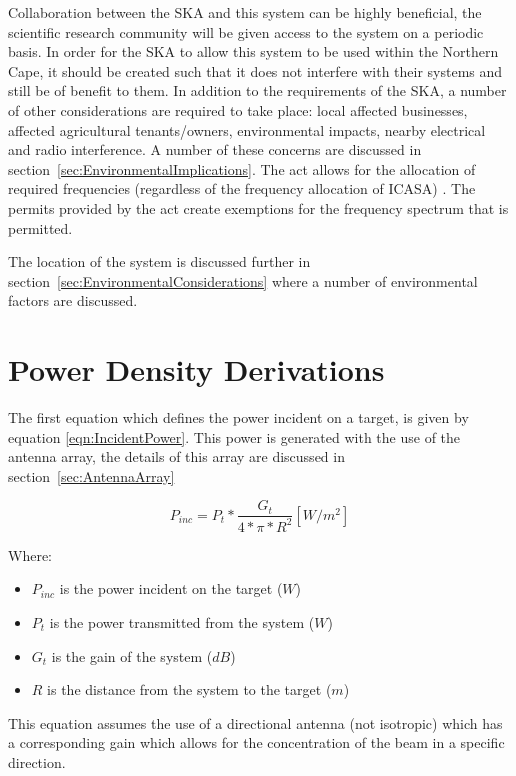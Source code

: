 \documentclass[11pt]{witseiepaper}
\begin{document}
\begin{bibunit}[witseie]
Collaboration between the SKA and this system can be highly beneficial, the scientific research community will be given access to the system on a periodic basis. In order for the SKA to allow this system to be used within the Northern Cape, it should be created such that it does not interfere with their systems and still be of benefit to them. In addition to the requirements of the SKA, a number of other considerations are required to take place: local affected businesses, affected agricultural tenants/owners, environmental impacts, nearby electrical and radio interference. A number of these concerns are discussed in section~\ref{sec:EnvironmentalImplications}.
The act allows for the allocation of required frequencies (regardless of the frequency allocation of ICASA) \cite{SKAAct}. The permits provided by the act create exemptions for the frequency spectrum that is permitted.

The location of the system is discussed further in section~\ref{sec:EnvironmentalConsiderations} where a number of environmental factors are discussed.

\section{Power Density Derivations} \label{sec:PowerDensityDerivations}
The first equation which defines the power incident on a target, is given by equation \ref{eqn:IncidentPower}. This power is generated with the use of the antenna array, the details of this array are discussed in section~\ref{sec:AntennaArray}

\begin{equation} \label{eqn:IncidentPower}
P_{inc} = P_t * \frac{G_{t}}{4 * \pi * R^2} [W/m^2]
\end{equation}

Where:
\begin{itemize}
    \item $P_{inc}$ is the power incident on the target ($W$)
    \item $P_t$ is the power transmitted from the system ($W$)
    \item $G_t$ is the gain of the system ($dB$)
    \item $R$ is the distance from the system to the target ($m$)
\end{itemize}

This equation assumes the use of a directional antenna (not isotropic) which has a corresponding gain which allows for the concentration of the beam in a specific direction.


\end{bibunit}
\end{document}
